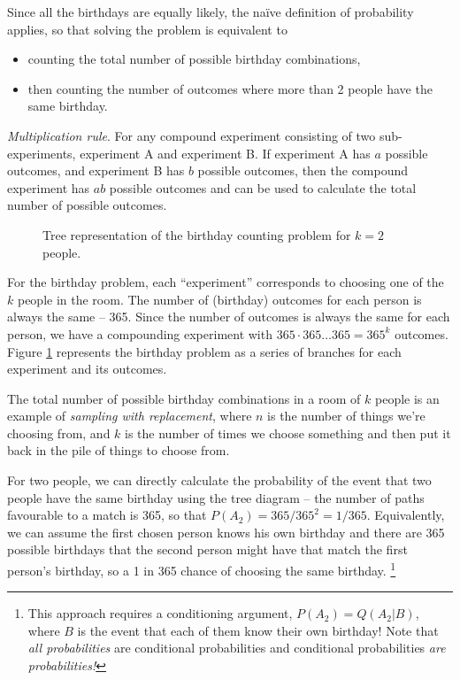 \documentclass[11pt,a4paper]{article}
\begin{document}
Since all the birthdays are equally likely, 
the naïve definition of probability applies, 
so that solving the problem is equivalent to
\begin{itemize}
\item
counting the total number of possible birthday combinations,
\item
then counting the number of outcomes where more than 2 people have the same birthday.
\end{itemize}

\emph{Multiplication rule}. 
For any compound experiment consisting of two sub-experiments, 
experiment A and experiment B. 
If experiment A has \(a\) possible outcomes, 
and experiment B has \(b\) possible outcomes,
then the compound experiment has \(ab\) possible outcomes and 
can be used to calculate the total number of possible outcomes.

\begin{figure}[h!]
\centering

\caption{Tree representation of the birthday counting problem for \(k=2\) people.}
\label{fig:tree}
\end{figure}

For the birthday problem, 
each ``experiment'' corresponds to choosing one of the \(k\) people in the room. 
The number of (birthday) outcomes for each person is always the same -- 365. 
Since the number of outcomes is always the same for each person, 
we have a compounding experiment with \(365 \cdot 365 \ldots 365 = 365^k\) outcomes.
Figure \ref{fig:tree} represents the birthday problem as a series of 
branches for each experiment and its outcomes.

The total number of possible birthday combinations in a room of \(k\) people is an example 
of \emph{sampling with replacement}, 
where \(n\) is the number of things we're choosing from, 
and \(k\) is the number of times we choose something and then put it 
back in the pile of things to choose from.

For two people, 
we can directly calculate the probability of the event
that two people have the same birthday using the tree diagram 
-- the number of paths favourable to a match is 365, 
so that \(P\left( A_{2} \right) = 365/365^{2} = 1/365\). 
Equivalently,
we can assume the first chosen person knows his own birthday 
and there are 365 possible birthdays that the second person might have that match the first person's birthday, 
so a 1 in 365 chance of choosing the same birthday.%
\footnote{%
This approach requires a conditioning argument, 
\(P\left( A_{2} \right) = Q(A_{2}|B)\), 
where \(B\) is the event that each of them know their own birthday! 
Note that \emph{all probabilities} are conditional 
probabilities and conditional probabilities \emph{are probabilities!}}
\end{document}
